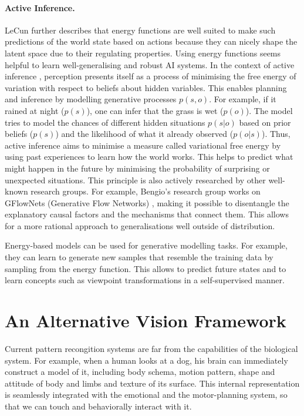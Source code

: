 \paragraph{Active Inference.} LeCun further describes that energy functions are well suited to make such predictions of the world state based on actions because they can nicely shape the latent space due to their regulating properties.
Using energy functions seems helpful to learn well-generalising and robust AI systems. In the context of active inference , perception presents itself as a process of minimising the free energy of variation with respect to beliefs about hidden variables. This enables planning and inference by modelling generative processes $p(s,o)$. For example, if it rained at night ($p(s)$), one can infer that the grass is wet ($p(o)$). The model tries to model the chances of different hidden situations $p(s|o)$ based on prior beliefs ($p(s)$) and the likelihood of what it already observed ($p(o|s)$). 
Thus, active inference aims to minimise a measure called variational free energy by using past experiences to learn how the world works. This helps to predict what might happen in the future by minimising the probability of surprising or unexpected situations.
This principle is also actively researched by other well-known research groups. For example, Bengio's research group works on GFlowNets (Generative Flow Networks) , making it possible to disentangle the explanatory causal factors and the mechanisms that connect them. This allows for a more rational approach to generalisations well outside of distribution.

Energy-based models can be used for generative modelling tasks. For example, they can learn to generate new samples that resemble the training data by sampling from the energy function. This allows to predict future states and to learn concepts such as viewpoint transformations in a self-supervised manner.


\section{An Alternative Vision Framework}
Current pattern recongition systems are far from the capabilities of the biological system.
For example, when a human looks at a dog, his brain can immediately construct a model of it, 
including body schema, motion pattern, shape and attitude of body and limbs and texture of its surface.  
This internal representation is seamlessly integrated with the emotional and the motor-planning system, so that we can touch and behaviorally interact with it.

